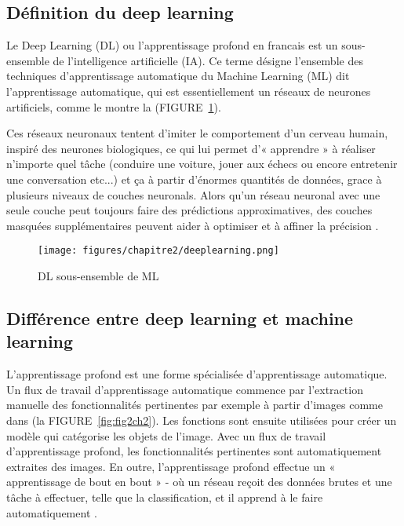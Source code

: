     \subsection{Définition du deep learning}
    \par Le Deep Learning (DL) ou l’apprentissage profond en francais est un sous-ensemble de l'intelligence artificielle (IA). Ce terme désigne l'ensemble des techniques d'apprentissage automatique du Machine Learning (ML) dit l’apprentissage automatique, qui est essentiellement un réseaux de neurones artificiels, comme le montre la (FIGURE~\ref{fig:fig1ch2}).
    
    \par Ces réseaux neuronaux tentent d'imiter le comportement d'un cerveau humain, inspiré des neurones biologiques, ce qui lui permet d'« apprendre » à réaliser n'importe quel tâche (conduire une voiture, jouer aux échecs ou encore entretenir une conversation etc...) et ça à partir d'énormes quantités de données, grace à plusieurs niveaux de couches neuronals. Alors qu’un réseau neuronal avec une seule couche peut toujours faire des prédictions approximatives, des couches masquées supplémentaires peuvent aider à optimiser et à affiner la précision \cite{ch2ref1,ch2ref2}.
    
    \begin{figure}[H]
    	\begin{center}
    		\texttt{[image: figures/chapitre2/deeplearning.png]}
    	\end{center}
    	\caption {DL sous-ensemble de ML}
    	\label{fig:fig1ch2}
    \end{figure} 
    
    \subsection{Différence entre deep learning et machine learning }
    \par L’apprentissage profond est une forme spécialisée d’apprentissage automatique. Un flux de travail d’apprentissage automatique commence par l’extraction manuelle des fonctionnalités pertinentes par exemple à partir d’images comme dans (la FIGURE~\ref{fig:fig2ch2}). Les fonctions sont ensuite utilisées pour créer un modèle qui catégorise les objets de l’image. Avec un flux de travail d’apprentissage profond, les fonctionnalités pertinentes sont automatiquement extraites des images. En outre, l’apprentissage profond effectue un « apprentissage de bout en bout » - où un réseau reçoit des données brutes et une tâche à effectuer, telle que la classification, et il apprend à le faire automatiquement \cite{ch2ref15}.
    
